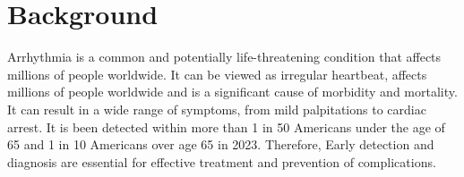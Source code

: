 \section{Background}
Arrhythmia is a common and potentially life-threatening condition that affects millions of people worldwide. It can be viewed as irregular heartbeat, affects millions of people worldwide and is a significant cause of morbidity and mortality. It can result in a wide range of symptoms, from mild palpitations to cardiac arrest. It is been detected within more than 1 in 50 Americans under the age of 65 and 1 in 10 Americans over age 65 in 2023. Therefore, Early detection and diagnosis are essential for effective treatment and prevention of complications. 